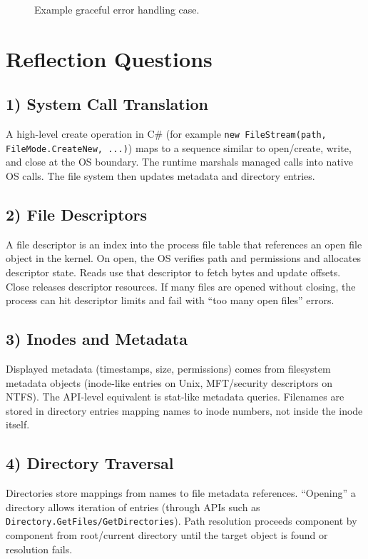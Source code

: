 \documentclass[11pt]{article}
\begin{document}
\begin{figure}[H]
\centering
{}
\caption{Example graceful error handling case.}
\end{figure}

\section{Reflection Questions}
\subsection*{1) System Call Translation}
A high-level create operation in C\# (for example \texttt{new FileStream(path, FileMode.CreateNew, ...)}) maps to a sequence similar to open/create, write, and close at the OS boundary. The runtime marshals managed calls into native OS calls. The file system then updates metadata and directory entries.

\subsection*{2) File Descriptors}
A file descriptor is an index into the process file table that references an open file object in the kernel. On open, the OS verifies path and permissions and allocates descriptor state. Reads use that descriptor to fetch bytes and update offsets. Close releases descriptor resources. If many files are opened without closing, the process can hit descriptor limits and fail with ``too many open files'' errors.

\subsection*{3) Inodes and Metadata}
Displayed metadata (timestamps, size, permissions) comes from filesystem metadata objects (inode-like entries on Unix, MFT/security descriptors on NTFS). The API-level equivalent is stat-like metadata queries. Filenames are stored in directory entries mapping names to inode numbers, not inside the inode itself.

\subsection*{4) Directory Traversal}
Directories store mappings from names to file metadata references. ``Opening'' a directory allows iteration of entries (through APIs such as \texttt{Directory.GetFiles/GetDirectories}). Path resolution proceeds component by component from root/current directory until the target object is found or resolution fails.
\end{document}
